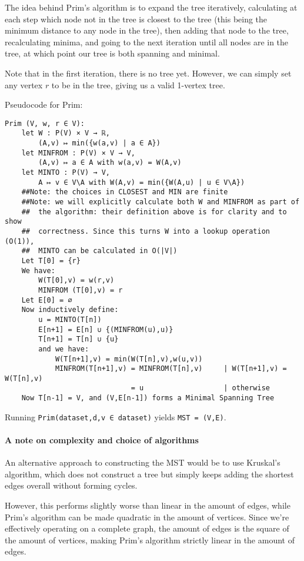 \documentclass[fleqn]{book}
\let\oldparagraph\paragraph
\renewcommand{\paragraph}[1]{\oldparagraph{#1}\mbox{}}
\begin{document}
The idea behind Prim's algorithm is to expand the tree iteratively,
calculating at each step which node not in the tree is closest to the
tree (this being the minimum distance to any node in the tree), then
adding that node to the tree, recalculating minima, and going to the
next iteration until all nodes are in the tree, at which point our tree
is both spanning and minimal.

Note that in the first iteration, there is no tree yet. However, we can
simply set any vertex \(r\) to be in the tree, giving us a valid
1-vertex tree.

Pseudocode for Prim:

\begin{verbatim}
Prim (V, w, r ∈ V):
    let W : P(V) × V → ℝ,
        (A,v) ↦ min({w(a,v) | a ∈ A})
    let MINFROM : P(V) × V → V,
        (A,v) ↦ a ∈ A with w(a,v) = W(A,v)
    let MINTO : P(V) → V,
        A ↦ v ∈ V\A with W(A,v) = min({W(A,u) | u ∈ V\A})
    ##Note: the choices in CLOSEST and MIN are finite
    ##Note: we will explicitly calculate both W and MINFROM as part of
    ##  the algorithm: their definition above is for clarity and to show
    ##  correctness. Since this turns W into a lookup operation (O(1)),
    ##  MINTO can be calculated in O(|V|)
    Let T[0] = {r}
    We have:
        W(T[0],v) = w(r,v)
        MINFROM (T[0],v) = r
    Let E[0] = ∅
    Now inductively define:
        u = MINTO(T[n])
        E[n+1] = E[n] ∪ {(MINFROM(u),u)}
        T[n+1] = T[n] ∪ {u}
        and we have:
            W(T[n+1],v) = min(W(T[n],v),w(u,v))
            MINFROM(T[n+1],v) = MINFROM(T[n],v)     | W(T[n+1],v) = W(T[n],v)
                              = u                   | otherwise
    Now T[n-1] = V, and (V,E[n-1]) forms a Minimal Spanning Tree
\end{verbatim}

Running \texttt{Prim(dataset,d,v\ ∈\ dataset)} yields
\texttt{MST\ =\ (V,E)}.

\paragraph{A note on complexity and choice of
algorithms}\label{a-note-on-complexity-and-choice-of-algorithms}

An alternative approach to constructing the MST would be to use
Kruskal's algorithm, which does not construct a tree but simply keeps
adding the shortest edges overall without forming cycles.

However, this performs slightly worse than linear in the amount of
edges, while Prim's algorithm can be made quadratic in the amount of
vertices. Since we're effectively operating on a complete graph, the
amount of edges is the square of the amount of vertices, making Prim's
algorithm strictly linear in the amount of edges.
\end{document}
